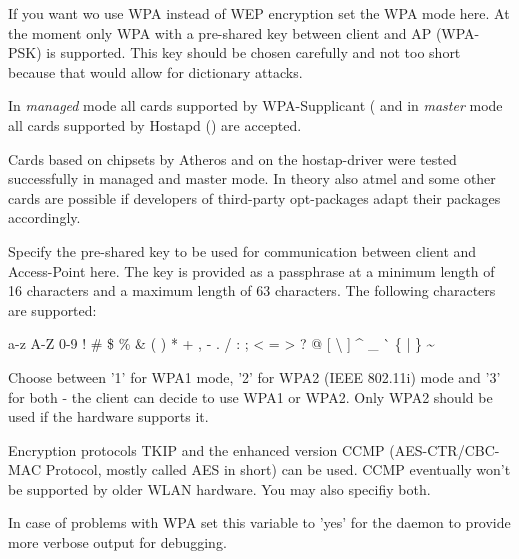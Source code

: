 \begin{description}

If you want wo use WPA instead of WEP encryption set the WPA mode here. 
At the moment only WPA with a pre-shared key between client and AP 
(WPA-PSK) is supported. This key should be chosen carefully and not too 
short because that would allow for dictionary attacks.

In \emph{managed} mode all cards supported by WPA-Supplicant
( 
and in \emph{master} mode all cards supported by Hostapd
() are accepted.

Cards based on chipsets by Atheros and on the hostap-driver were tested successfully 
in managed and master mode. In theory also atmel and some other cards are possible 
if developers of third-party opt-packages adapt their packages accordingly. 


      Specify the pre-shared key to be used for communication between client and 
      Access-Point here. The key is provided as a passphrase at a minimum length 
      of 16 characters and a maximum length of 63 characters. 
      The following characters are supported:

      a-z A-Z 0-9 ! \# \$ \% \& ( ) * + , - . / : ; {\textless} = {\textgreater} ? @ [ {\textbackslash} ] \^{} \_ \`{} \{ | \} {\textasciitilde}


      Choose between '1' for WPA1 mode, '2' for WPA2 (IEEE 802.11i) mode 
      and '3' for both - the client can decide to use WPA1 or WPA2. Only 
      WPA2 should be used if the hardware supports it.
      

      Encryption protocols TKIP and the enhanced version CCMP (AES-CTR/CBC-MAC Protocol, 
      mostly called AES in short) can be used. CCMP eventually won't be supported by 
      older WLAN hardware. You may also specifiy both.
      

      In case of problems with WPA set this variable to 'yes' for the daemon 
      to provide more verbose output for debugging.


\end{description}

